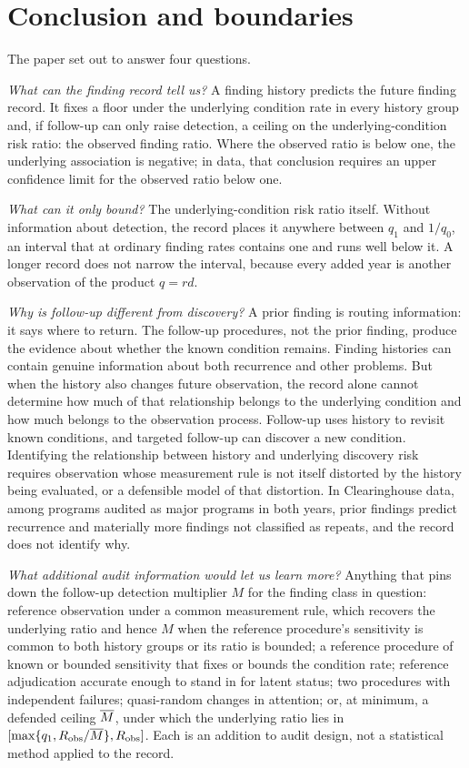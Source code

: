 \section{Conclusion and boundaries}\label{sec:conclusion}

The paper set out to answer four questions.

\emph{What can the finding record tell us?} A finding history predicts the
future finding record. It fixes a floor under the underlying condition rate
in every history group and, if follow-up can only raise detection, a ceiling
on the underlying-condition risk ratio: the observed finding ratio. Where the
observed ratio is below one, the underlying association is negative; in data,
that conclusion requires an upper confidence limit for the observed ratio
below one.

\emph{What can it only bound?} The underlying-condition risk ratio itself.
Without information about detection, the record places it anywhere between
$q_1$ and $1/q_0$, an interval that at ordinary finding rates contains one and
runs well below it. A longer record does not narrow the interval, because
every added year is another observation of the product $q = rd$.

\emph{Why is follow-up different from discovery?} A prior finding is routing
information: it says where to return. The follow-up procedures, not the prior
finding, produce the evidence about whether the known condition remains.
Finding histories can contain genuine information about both recurrence and
other problems. But when the history also changes future observation, the
record alone cannot determine how much of that relationship belongs to the
underlying condition and how much belongs to the observation process.
Follow-up uses history to revisit known conditions, and targeted follow-up
can discover a new condition. Identifying the relationship between history
and underlying discovery risk requires observation whose measurement rule is
not itself distorted by the history being evaluated, or a defensible model of
that distortion. In
Clearinghouse data, among programs audited as major programs in both years,
prior findings predict recurrence and materially more findings not classified
as repeats, and the record does not identify why.

\emph{What additional audit information would let us learn more?} Anything
that pins down the follow-up detection multiplier $M$ for the finding class
in question: reference observation under a common measurement rule, which
recovers the underlying ratio and hence $M$ when the reference procedure's
sensitivity is common to both history groups or its ratio is bounded; a
reference procedure of known or bounded sensitivity that fixes or bounds the
condition rate; reference adjudication accurate
enough to stand in for latent status; two procedures with independent
failures; quasi-random changes in attention; or, at minimum, a defended
ceiling $\overline{M}$, under which the underlying ratio lies in
$[\max\{q_1, R_{\mathrm{obs}}/\overline{M}\}, R_{\mathrm{obs}}]$.
Each is an addition to audit design, not a statistical method applied to the
record.

